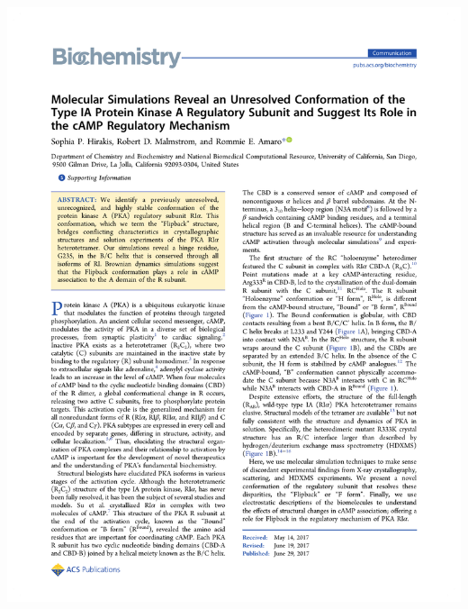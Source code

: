 \documentclass[12pt]{ucsddissertation}
\begin{document}
\includegraphics[height=1\textheight]{Flipback_Paper_Chapter3.pdf}

\end{document}

